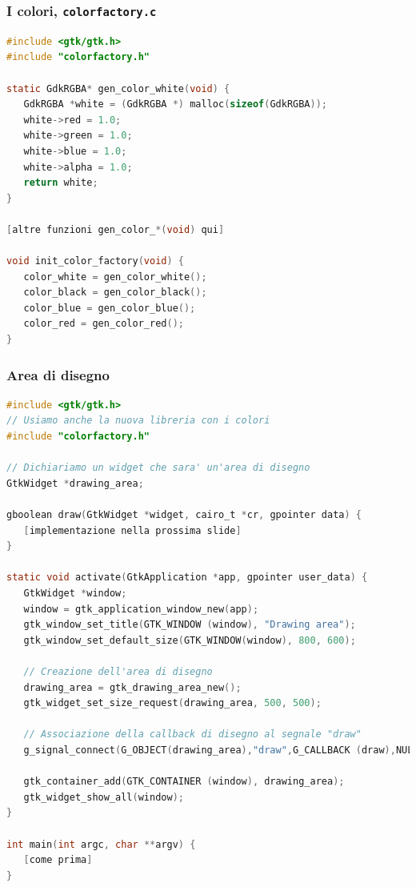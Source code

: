 \documentclass{beamer}
\begin{document}
\begin{frame}[fragile]
\frametitle{I colori, \texttt{colorfactory.c}}
\begin{lstlisting}[language=C]
#include <gtk/gtk.h>
#include "colorfactory.h"

static GdkRGBA* gen_color_white(void) {
   GdkRGBA *white = (GdkRGBA *) malloc(sizeof(GdkRGBA));
   white->red = 1.0;
   white->green = 1.0;
   white->blue = 1.0;
   white->alpha = 1.0;
   return white;
}

[altre funzioni gen_color_*(void) qui]

void init_color_factory(void) {
   color_white = gen_color_white();
   color_black = gen_color_black();
   color_blue = gen_color_blue();
   color_red = gen_color_red();
}
\end{lstlisting}
\end{frame}

\begin{frame}[fragile]
\frametitle{Area di disegno}
\begin{lstlisting}[language=C]
#include <gtk/gtk.h>
// Usiamo anche la nuova libreria con i colori
#include "colorfactory.h"

// Dichiariamo un widget che sara' un'area di disegno
GtkWidget *drawing_area;

gboolean draw(GtkWidget *widget, cairo_t *cr, gpointer data) {
   [implementazione nella prossima slide]
}

static void activate(GtkApplication *app, gpointer user_data) {
   GtkWidget *window;
   window = gtk_application_window_new(app);
   gtk_window_set_title(GTK_WINDOW (window), "Drawing area");
   gtk_window_set_default_size(GTK_WINDOW(window), 800, 600);
   
   // Creazione dell'area di disegno
   drawing_area = gtk_drawing_area_new();
   gtk_widget_set_size_request(drawing_area, 500, 500);
   
   // Associazione della callback di disegno al segnale "draw"
   g_signal_connect(G_OBJECT(drawing_area),"draw",G_CALLBACK (draw),NULL);
   
   gtk_container_add(GTK_CONTAINER (window), drawing_area);
   gtk_widget_show_all(window);
}

int main(int argc, char **argv) {
   [come prima]
}
\end{lstlisting}
\end{frame}
\end{document}
